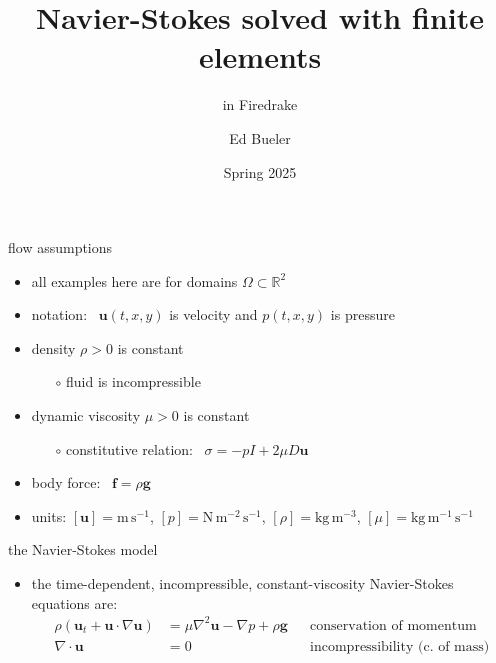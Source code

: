 \documentclass[10pt,hyperref]{beamer}
\title{Navier-Stokes solved with finite elements}
\subtitle{in Firedrake}
\author{Ed Bueler}
\institute{MATH 692 Fluids \& Solids Seminar}
\date{Spring 2025}
\newcommand{\bbf}{\mathbf{f}}
\newcommand{\bg}{\mathbf{g}}
\newcommand{\bu}{\mathbf{u}}
\newcommand{\grad}{\nabla}
\newcommand{\Div}{\nabla\cdot}
\newcommand{\RR}{\mathbb{R}}
\begin{document}
\beamertemplatenavigationsymbolsempty

\begin{frame}
  \maketitle
\end{frame}


\begin{frame}{flow assumptions}

\begin{itemize}
\item all examples here are for domains $\Omega \subset \RR^2$
\item notation: \, $\bu(t,x,y)$ is velocity and $p(t,x,y)$ is pressure
\item density $\rho>0$ is constant
    \begin{itemize}
    \item[$\circ$] fluid is incompressible
    \end{itemize}
\item dynamic viscosity $\mu>0$ is constant
    \begin{itemize}
    \item[$\circ$] constitutive relation: \, $\sigma = -p I + 2 \mu D\bu$
    \end{itemize}
\item body force: \, $\bbf = \rho \bg$

\bigskip
\item units: $[\bu]=\text{m}\,\text{s}^{-1}$, $[p]=\text{N}\,\text{m}^{-2}\,\text{s}^{-1}$, $[\rho]=\text{kg}\,\text{m}^{-3}$, $[\mu]=\text{kg}\,\text{m}^{-1}\,\text{s}^{-1}$
\end{itemize}
\end{frame}


\begin{frame}{the Navier-Stokes model}

\begin{itemize}
\item the time-dependent, incompressible, constant-viscosity Navier-Stokes equations are:
\begin{align*}
\rho\left(\bu_t + \bu \cdot \grad \bu\right) &= \mu \grad^2 \bu - \grad p + \rho \bg & &\text{conservation of momentum} \\
\Div \bu &= 0 & &\text{incompressibility (c.~of mass)}
\end{align*}
\end{itemize}
\end{frame}
\end{document}
